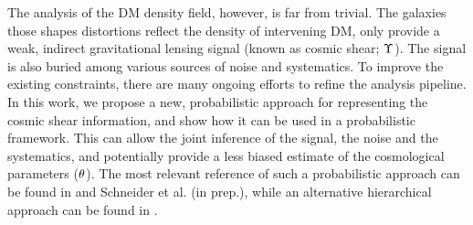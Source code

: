 The analysis of the DM density field, however, is far from trivial. 
The galaxies those shapes distortions reflect the density of intervening DM, 
only provide a weak, indirect gravitational lensing signal (known as cosmic
shear; $\Upsilon$). The signal is also buried among various sources of noise
and systematics. 
To improve the existing constraints, there are many ongoing 
efforts to refine the analysis pipeline. 
In this work, we propose a new, probabilistic approach for representing 
the cosmic shear information, 
and show how it can be used in a probabilistic framework. 
This can allow the joint inference of the signal, the noise and the systematics, 
and potentially provide a less biased estimate of the cosmological parameters 
(${\bf \theta}$). 
The most relevant reference of such a probabilistic approach can be found in 
\cite{Schneider2014} and Schneider et al. (in prep.), 
while an alternative hierarchical approach can be found in \cite{Alsing2015}. 

